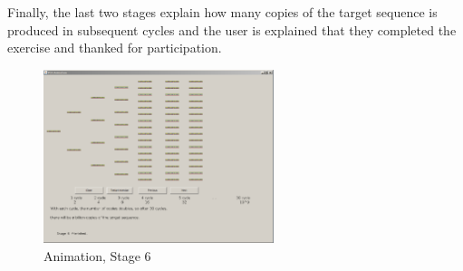 Finally, the last two stages explain how many copies of the target sequence is produced in subsequent cycles and the user is explained that they completed the exercise and thanked for participation.

\begin{figure}[h]
  \begin{center}
	\includegraphics[width=0.6\textwidth]{./images/AnimImpl/Stage6.png}
    \caption{
      \label{fig:AnimImpl:stage6}
      Animation, Stage 6
    }
  \end{center}
\end{figure}
